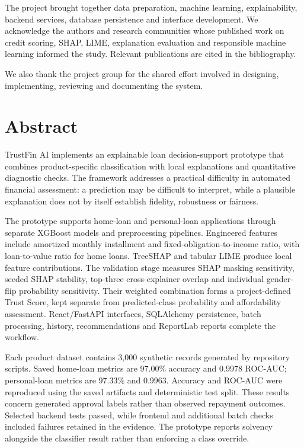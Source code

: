 \documentclass[12pt,a4paper]{report}
\begin{document}
The project brought together data preparation, machine learning, explainability, backend services, database persistence and interface development. We acknowledge the authors and research communities whose published work on credit scoring, SHAP, LIME, explanation evaluation and responsible machine learning informed the study. Relevant publications are cited in the bibliography.

We also thank the project group for the shared effort involved in designing, implementing, reviewing and documenting the system.

\chapter*{Abstract}
TrustFin AI implements an explainable loan decision-support prototype that combines product-specific classification with local explanations and quantitative diagnostic checks. The framework addresses a practical difficulty in automated financial assessment: a prediction may be difficult to interpret, while a plausible explanation does not by itself establish fidelity, robustness or fairness.

The prototype supports home-loan and personal-loan applications through separate XGBoost models and preprocessing pipelines. Engineered features include amortized monthly installment and fixed-obligation-to-income ratio, with loan-to-value ratio for home loans. TreeSHAP and tabular LIME produce local feature contributions. The validation stage measures SHAP masking sensitivity, seeded SHAP stability, top-three cross-explainer overlap and individual gender-flip probability sensitivity. Their weighted combination forms a project-defined Trust Score, kept separate from predicted-class probability and affordability assessment. React/FastAPI interfaces, SQLAlchemy persistence, batch processing, history, recommendations and ReportLab reports complete the workflow.

Each product dataset contains 3,000 synthetic records generated by repository scripts. Saved home-loan metrics are 97.00\% accuracy and 0.9978 ROC-AUC; personal-loan metrics are 97.33\% and 0.9963. Accuracy and ROC-AUC were reproduced using the saved artifacts and deterministic test split. These results concern generated approval labels rather than observed repayment outcomes. Selected backend tests passed, while frontend and additional batch checks included failures retained in the evidence. The prototype reports solvency alongside the classifier result rather than enforcing a class override.
\end{document}

